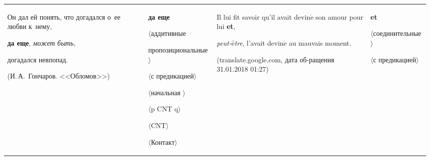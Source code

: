 \begin{multicols}{2}
\begin{enumerate}[(1)]
\begin{table}
\begin{center}
\begin{tabular}{|p{50.2mm}|p{31mm}|p{42mm}|p{26mm}|}


\hline


Он дал ей понять, что догадался о~ее любви к~нему, 


\textbf{да еще}, \textit{может быть,} 


догадался невпопад.\newline


\newline


\newline


\newline


\newline


(И.\,А.~Гончаров. <<Обломов>>)&\textbf{да еще}\newline


$\langle$аддитивные\newline


 пропозициональные$\rangle$\newline


$\langle$с предикацией$\rangle$\newline


$\langle$начальная $\rangle$\newline


$\langle$p CNT q$\rangle$\newline


$\langle$CNT$\rangle$\newline


$\langle$Контакт$\rangle$


&Il lui fit savoir qu'il avait devin$\acute{\mbox{e}}$ son amour pour lui \textbf{et},  


\textit{peut-$\hat{\mbox{e}}$tre}, l'avait devin$\acute{\mbox{e}}$ au mauvais moment.\newline


\newline


\newline


(translate.google.com, дата об-\linebreak ращения 31.01.2018 01:27)&\textbf{et}\newline 


$\langle$соединительные$\rangle$\newline


$\langle$с предикацией$\rangle$\newline



\end{tabular}
\end{center}
\end{table}
\end{enumerate}
\end{multicols}
